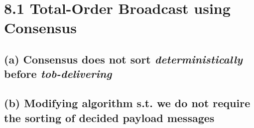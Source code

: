 \documentclass{article}
\begin{document}
	\pagestyle{fancy}
	\section*{8.1 Total-Order Broadcast using Consensus}
	\begin{adjustwidth}{2em}{2em}
		\subsection*{(a) Consensus does not sort \textit{deterministically} before \textit{tob-delivering}}
		\begin{adjustwidth}{2em}{2em}
		\end{adjustwidth}
		\subsection*{(b) Modifying algorithm s.t. we do not require the sorting of decided payload messages}
		\begin{adjustwidth}{2em}{2em}
		\end{adjustwidth}
	\end{adjustwidth}
	
\end{document}
